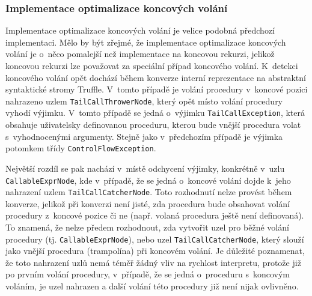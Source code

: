 \documentclass[
  master,
  biblatex,
  figures=true,
  theorems,
  sourcecodes,
  glossaries,
  index
]{kidiplom}
\begin{document}
\clearpage

\subsubsection{Implementace optimalizace koncových volání}
Implementace optimalizace koncových volání je velice podobná předchozí implementaci. Mělo by být zřejmé, že implementace optimalizace koncových volání je o~něco pomalejší než implementace na koncovou rekurzi, jelikož koncovou rekurzi lze považovat za speciální případ koncového volání. K~detekci koncového volání opět dochází během konverze interní reprezentace na abstraktní syntaktické stromy Truffle. V~tomto případě je volání procedury v~koncové pozici nahrazeno uzlem \texttt{TailCallThrowerNode}, který opět místo volání procedury vyhodí výjimku. V~tomto případě se jedná o~výjimku \texttt{TailCallException}, která obsahuje uživatelsky definovanou proceduru, kterou bude vnější procedura volat s~vyhodnocenými argumenty. Stejně jako v~předchozím případě je výjimka potomkem třídy \texttt{ControlFlowException}. 


Největší rozdíl se pak nachází v~místě odchycení výjimky, konkrétně v~uzlu \texttt{CallableExprNode}, kde v~případě, že se jedná o~koncové volání dojde k~jeho nahrazení uzlem \texttt{TailCallCatcherNode}. Toto rozhodnutí nelze provést během konverze, jelikož při konverzi není jisté, zda procedura bude obsahovat volání procedury z~koncové pozice či ne (např. volaná procedura ještě není definovaná). To znamená, že nelze předem rozhodnout, zda vytvořit uzel pro běžné volání procedury (tj. \texttt{CallableExprNode}), nebo uzel \texttt{TailCallCatcherNode}, který slouží jako vnější procedura (trampolína) při koncovém volání. Je důležité poznamenat, že toto nahrazení uzlů nemá téměř žádný vliv na rychlost interpretu, protože již po prvním volání procedury, v~případě, že se jedná o~proceduru s~koncovým voláním, je uzel nahrazen a další volání této procedury již není nijak ovlivněno.
\end{document}
